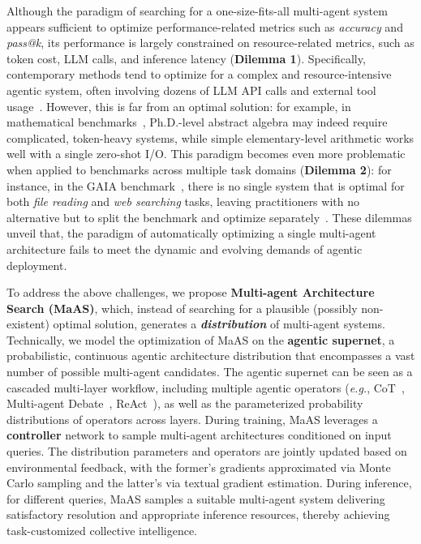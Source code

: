 \documentclass{article}
\theoremstyle{plain}
\theoremstyle{definition}
\theoremstyle{remark}
\newcommand{\ourmethod}{{{MaAS}}\xspace}
\begin{document}
Although the paradigm of searching for a one-size-fits-all multi-agent system appears sufficient to optimize performance-related metrics such as \textit{accuracy} and \textit{pass@k}, its performance is largely constrained on resource-related metrics, such as token cost, LLM calls, and inference latency (\textbf{Dilemma 1}). Specifically, contemporary methods tend to optimize for a complex and resource-intensive agentic system, often involving dozens of LLM API calls and external tool usage~\citep{arXiv2023_Dynamic-LLM-Agent}. However, this is far from an optimal solution: for example, in mathematical benchmarks~\citep{hendrycksmath2021}, Ph.D.-level abstract algebra may indeed require complicated, token-heavy systems, while simple elementary-level arithmetic works well with a single zero-shot I/O. This paradigm becomes even more problematic when applied to benchmarks across multiple task domains (\textbf{Dilemma 2}): for instance, in the GAIA benchmark~\citep{mialon2023gaiabenchmark}, there is no single system that is optimal for both \textit{file reading} and \textit{web searching} tasks, leaving practitioners with no alternative but to split the benchmark and optimize separately~\citep{zhuge2024gptswarm}. These dilemmas unveil that, the paradigm of automatically optimizing a single multi-agent architecture fails to meet the dynamic and evolving demands of agentic deployment. 



To address the above challenges, we propose \textbf{Multi-agent Architecture Search (\ourmethod)}, which, instead of searching for a plausible (possibly non-existent) optimal solution, generates a \textbf{\textit{distribution}} of multi-agent systems. Technically, we model the optimization of \ourmethod on the \textbf{agentic supernet}, a probabilistic, continuous agentic architecture distribution that encompasses a vast number of possible multi-agent candidates. The agentic supernet can be seen as a cascaded multi-layer workflow, including  multiple agentic operators (\textit{e.g.}, CoT~\citep{cot},  Multi-agent Debate~\citep{arXiv2023_MultiAgent-Debate}, ReAct~\citep{yao2023react}), as well as  the parameterized probability distributions of operators across layers. During training, \ourmethod leverages a \textbf{controller} network to sample multi-agent architectures conditioned on input queries. The distribution parameters and operators are jointly updated based on environmental feedback, with the former's gradients approximated via Monte Carlo sampling and the latter's via textual gradient estimation.
During inference, for different queries, \ourmethod samples a suitable multi-agent system delivering satisfactory resolution and appropriate inference resources, thereby achieving task-customized collective intelligence.
\end{document}
